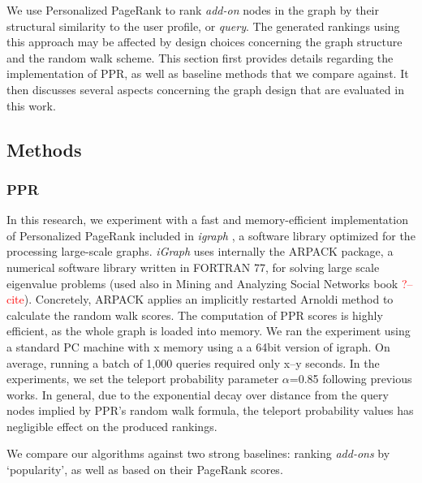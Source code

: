 \documentclass[11pt,oneside]{book}
\let\Oldsubsection\subsection
\renewcommand{\subsection}{\FloatBarrier\Oldsubsection}
\let\Oldsubsubsection\subsubsection
\renewcommand{\subsubsection}{\FloatBarrier\Oldsubsubsection}
\begin{document}
We use Personalized PageRank to rank {\it add-on} nodes in
the graph by their structural similarity to the user profile, or {\it
  query}. The generated rankings using this approach may be affected
by design choices concerning the graph structure and the random walk scheme. This section first provides details regarding the implementation of PPR, as well as baseline methods that we compare against. It then discusses several aspects concerning the graph design that are evaluated in this work.

\subsection{Methods}
\label{sec:methods}

\subsubsection{PPR} In this research, we experiment with a fast and memory-efficient implementation of Personalized PageRank included in {\it igraph} \citep{igraph}, a software library optimized for the processing large-scale graphs. {\it iGraph} uses internally the ARPACK package, a numerical software library written in FORTRAN 77, for solving large
scale eigenvalue problems (used also in Mining and Analyzing Social
Networks book \textcolor{red}{?--cite}). Concretely, ARPACK applies an implicitly restarted Arnoldi method to calculate the random walk scores. The computation of PPR scores is highly efficient, as the whole graph is loaded into memory. We ran the experiment using a standard PC machine with x memory using a a 64bit version of igraph. On average, running a batch of 1,000 queries required only x--y seconds. In the experiments, we set the teleport probability parameter $\alpha$=0.85 following previous works. In general, due to the exponential decay over distance from the query nodes implied by PPR's random walk formula, the teleport probability values has negligible effect on the produced rankings.


We compare our algorithms against two strong baselines: ranking {\it add-ons} by `popularity', as well as based on their PageRank scores. 
\end{document}
